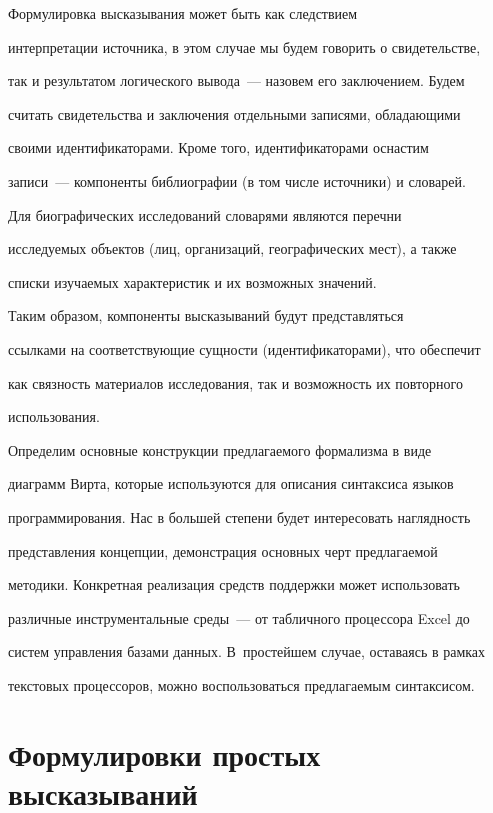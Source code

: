      Формулировка высказывания может быть как следствием 


интерпретации источника, в этом случае мы будем говорить о свидетельстве, 


так и результатом логического вывода~--- назовем его заключением. Будем 


считать свидетельства и заключения отдельными записями, обладающими 


своими идентификаторами. Кроме того, идентификаторами оснастим 


записи~--- компоненты библиографии (в том числе источники) и словарей. 


Для биографических исследований словарями являются перечни 


исследуемых объектов (лиц, организаций, географических мест), а также 


списки изучаемых характеристик и их возможных значений.


     


     Таким образом, компоненты высказываний будут представляться 


ссылками на соответствующие сущности (идентификаторами), что обеспечит 


как связность материалов исследования, так и возможность их повторного 


использования.  


     


     Определим основные конструкции предлагаемого формализма в виде 


диаграмм Вирта, которые используются для описания синтаксиса языков 


программирования. Нас в большей степени будет интересовать наглядность 


представления концепции, демонстрация основных черт предлагаемой 


методики. Конкретная реализация средств поддержки может использовать 


различные инструментальные среды~--- от табличного процессора Excel до 


систем управления базами данных.  В~простейшем случае, оставаясь в рамках 


текстовых процессоров, можно воспользоваться предлагаемым синтаксисом. 


\section{Формулировки простых высказываний}


